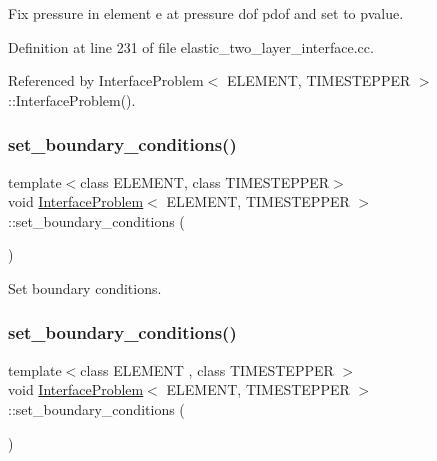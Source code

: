 Fix pressure in element e at pressure dof pdof and set to pvalue. 



Definition at line 231 of file elastic\+\_\+two\+\_\+layer\+\_\+interface.\+cc.



Referenced by Interface\+Problem$<$ E\+L\+E\+M\+E\+N\+T, T\+I\+M\+E\+S\+T\+E\+P\+P\+E\+R $>$\+::\+Interface\+Problem().

\mbox{\label{classInterfaceProblem_a844445832ad7a32aa9f5d03ffdb40ebb}} 
\subsubsection{\texorpdfstring{set\+\_\+boundary\+\_\+conditions()}{set\_boundary\_conditions()}\hspace{0.1cm}{\footnotesize\ttfamily [1/2]}}
{\footnotesize\ttfamily template$<$class E\+L\+E\+M\+E\+NT, class T\+I\+M\+E\+S\+T\+E\+P\+P\+ER$>$ \\
void \hyperlink{classInterfaceProblem}{Interface\+Problem}$<$ E\+L\+E\+M\+E\+NT, T\+I\+M\+E\+S\+T\+E\+P\+P\+ER $>$\+::set\+\_\+boundary\+\_\+conditions (\begin{DoxyParamCaption}{ }\end{DoxyParamCaption})}



Set boundary conditions. 

\mbox{\label{classInterfaceProblem_a844445832ad7a32aa9f5d03ffdb40ebb}} 
\subsubsection{\texorpdfstring{set\+\_\+boundary\+\_\+conditions()}{set\_boundary\_conditions()}\hspace{0.1cm}{\footnotesize\ttfamily [2/2]}}
{\footnotesize\ttfamily template$<$class E\+L\+E\+M\+E\+NT , class T\+I\+M\+E\+S\+T\+E\+P\+P\+ER $>$ \\
void \hyperlink{classInterfaceProblem}{Interface\+Problem}$<$ E\+L\+E\+M\+E\+NT, T\+I\+M\+E\+S\+T\+E\+P\+P\+ER $>$\+::set\+\_\+boundary\+\_\+conditions (\begin{DoxyParamCaption}{ }\end{DoxyParamCaption})}



